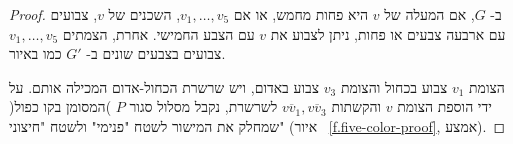 \begin{proof}
ב-%
$G$,
אם המעלה של
$v$
היא פחות מחמש,
או אם
$v_1,\ldots,v_5$,
השכנים של
$v$,
צבועים עם ארבעה צבעים או פחות, ניתן לצבוע את
$v$
עם הצבע החמישי.
אחרת, הצמתים
$v_1,\ldots,v_5$
צבועים בצבעים שונים ב-%
$G'$
כמו באיור.

הצומת
$v_1$
צבוע בכחול והצומת 
$v_3$
צבוע באדום, ויש שרשרת הכחול-אדום המכילה אותם. על ידי הוספת הצומת 
$v$
והקשתות
$\overline{vv_1},\overline{vv_3}$
לשרשרת, נקבל מסלול סגור
$P$
)המסומן בקו כפול( שמחלק את המישור לשטח "פנימי" ולשטח "חיצוני" (איור%
~\ref{f.five-color-proof}, אמצע).

%
%
%
%  
%


\end{proof}
